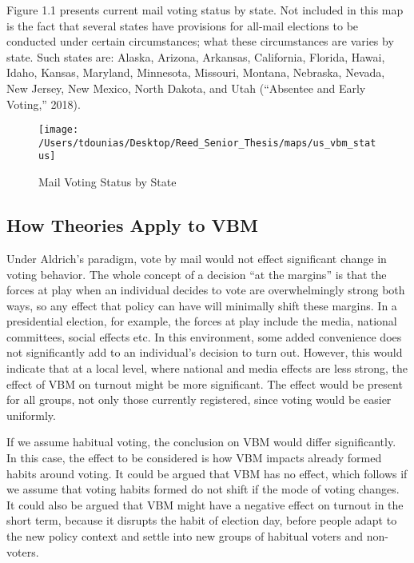 \documentclass[12pt,twoside]{reedthesis}
\begin{document}
  Figure 1.1 presents current mail voting status by state. Not included in
  this map is the fact that several states have provisions for all-mail
  elections to be conducted under certain circumstances; what these
  circumstances are varies by state. Such states are: Alaska, Arizona,
  Arkansas, California, Florida, Hawai, Idaho, Kansas, Maryland,
  Minnesota, Missouri, Montana, Nebraska, Nevada, New Jersey, New Mexico,
  North Dakota, and Utah (``Absentee and Early Voting,'' 2018).
  
  \begin{figure}
  
  {\centering \texttt{[image: /Users/tdounias/Desktop/Reed\_Senior\_Thesis/maps/us\_vbm\_status]} 
  
  }
  
  \caption[Mail Voting Status by State]{Mail Voting Status by State}\label{fig:vbm us}
  \end{figure}
  
  \subsection{How Theories Apply to VBM}\label{how-theories-apply-to-vbm}
  
  Under Aldrich's paradigm, vote by mail would not effect significant
  change in voting behavior. The whole concept of a decision ``at the
  margins'' is that the forces at play when an individual decides to vote
  are overwhelmingly strong both ways, so any effect that policy can have
  will minimally shift these margins. In a presidential election, for
  example, the forces at play include the media, national committees,
  social effects etc. In this environment, some added convenience does not
  significantly add to an individual's decision to turn out. However, this
  would indicate that at a local level, where national and media effects
  are less strong, the effect of VBM on turnout might be more significant.
  The effect would be present for all groups, not only those currently
  registered, since voting would be easier uniformly.
  
  If we assume habitual voting, the conclusion on VBM would differ
  significantly. In this case, the effect to be considered is how VBM
  impacts already formed habits around voting. It could be argued that VBM
  has no effect, which follows if we assume that voting habits formed do
  not shift if the mode of voting changes. It could also be argued that
  VBM might have a negative effect on turnout in the short term, because
  it disrupts the habit of election day, before people adapt to the new
  policy context and settle into new groups of habitual voters and
  non-voters.
  
\end{document}
